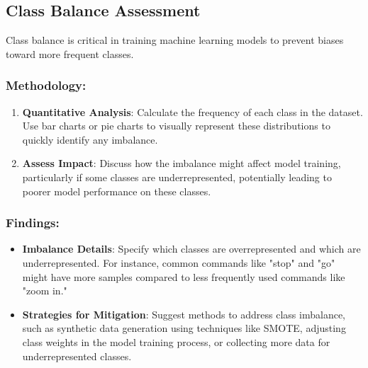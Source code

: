 \subsection{Class Balance Assessment}

Class balance is critical in training machine learning models to prevent biases toward more frequent classes.

\subsubsection{Methodology:}

\begin{enumerate}
    \item \textbf{Quantitative Analysis}: Calculate the frequency of each class in the dataset. Use bar charts or pie charts to visually represent these distributions to quickly identify any imbalance.
    \item \textbf{Assess Impact}: Discuss how the imbalance might affect model training, particularly if some classes are underrepresented, potentially leading to poorer model performance on these classes.
\end{enumerate}

\subsubsection{Findings:}

\begin{itemize}
    \item \textbf{Imbalance Details}: Specify which classes are overrepresented and which are underrepresented. For instance, common commands like "stop" and "go" might have more samples compared to less frequently used commands like "zoom in."
    \item \textbf{Strategies for Mitigation}: Suggest methods to address class imbalance, such as synthetic data generation using techniques like SMOTE, adjusting class weights in the model training process, or collecting more data for underrepresented classes.
\end{itemize}
